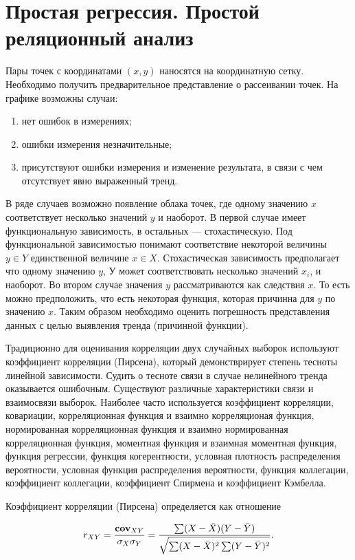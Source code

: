 \documentclass[12pt]{article}
\begin{document}
\section{Простая регрессия. Простой реляционный анализ}
Пары точек с координатами $(x, y)$ наносятся на координатную сетку. Необходимо получить предварительное представление о рассеивании точек. На графике возможны случаи:
\begin{enumerate}
    \item нет ошибок в измерениях;
    \item ошибки измерения незначительные;
    \item присутствуют ошибки измерения и изменение результата, в связи с чем отсутствует явно выраженный тренд.
\end{enumerate}
   
В ряде случаев возможно появление облака точек, где одному значению $x$ соответствует несколько значений $y$ и наоборот. В первой случае имеет функциональную зависимость, в остальных --- стохастическую. Под функциональной зависимостью понимают соответствие некоторой величины $y \in Y$ единственной величине $x \in X$. Стохастическая зависимость предполагает что одному значению $y$,  У может соответствовать несколько значений $x_i$, и наоборот. Во втором случае значения $y$ рассматриваются как следствия $x$. То есть можно предположить, что есть некоторая функция, которая причинна для $y$ по значению $x$. Таким образом необходимо оценить погрешность представления данных с целью выявления тренда (причинной функции).

Традиционно для оценивания корреляции двух случайных выборок используют коэффициент корреляции (Пирсена), который демонстврирует степень тесноты линейной зависимости. Судить о тесноте связи в случае нелинейного тренда оказывается ошибочным. Существуют различные характеристики связи и взаимосвязи выборок. Наиболее часто используется коэффициент корреляции, ковариации, корреляционная функция и взаимно корреляционая функция, нормированная корреляционная функция и взаимно нормированная корреляционная функция, моментная функция и взаимная моментная функция, функция регрессии, функция когерентности, условная плотность распределения вероятности, условная функция распределения вероятности, функция коллегации, коэффициент коллегации, коэффициент Спирмена и коэффициент Кэмбелла. 

Коэффициент корреляции (Пирсена) определяется как отношение

\[ r_{XY} = \frac{\textbf{\textrm{cov}}_{XY}}{\sigma_X \sigma_Y} = \frac{\sum (X - \bar{X})(Y - \bar{Y})}{\sqrt{\sum (X - \bar{X})^2 \sum (Y - \bar{Y})^2}}.\]
\end{document}
